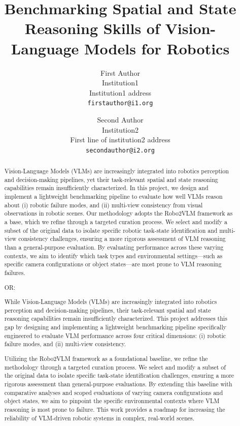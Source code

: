 \documentclass[10pt,twocolumn,letterpaper]{article}
\title{Benchmarking Spatial and State Reasoning Skills of Vision-Language Models for Robotics}
\author{First Author\\
Institution1\\
Institution1 address\\
{\tt\small firstauthor@i1.org}
\and
Second Author\\
Institution2\\
First line of institution2 address\\
{\tt\small secondauthor@i2.org}
}
\begin{document}
\maketitle
\begin{abstract}
Vision-Language Models (VLMs) are increasingly integrated into robotics perception and decision-making pipelines, yet their task-relevant spatial and state reasoning capabilities remain insufficiently characterized.
In this project, we design and implement a lightweight benchmarking pipeline to evaluate how well VLMs reason about (i) robotic failure modes, and (ii) multi-view consistency from visual observations in robotic scenes.
Our methodology adopts the Robo2VLM framework as a base, which we refine through a targeted curation process. We select and modify a subset of the original data to isolate specific robotic task-state identification and multi-view consistency challenges, ensuring a more rigorous assessment of VLM reasoning than a general-purpose evaluation.
By evaluating performance across these varying contexts, we aim to identify which task types and environmental settings—such as specific camera configurations or object states—are most prone to VLM reasoning failures.

OR:

While Vision-Language Models (VLMs) are increasingly integrated into robotics perception and decision-making pipelines, their task-relevant spatial and state reasoning capabilities remain insufficiently characterized. This project addresses this gap by designing and implementing a lightweight benchmarking pipeline specifically engineered to evaluate VLM performance across four critical dimensions: (i) robotic failure modes, and (ii) multi-view consistency.

Utilizing the Robo2VLM framework as a foundational baseline, we refine the methodology through a targeted curation process. We select and modify a subset of the original data to isolate specific task-state identification challenges, ensuring a more rigorous assessment than general-purpose evaluations. By extending this baseline with comparative analyses and scoped evaluations of varying camera configurations and object states, we aim to pinpoint the specific environmental contexts where VLM reasoning is most prone to failure. This work provides a roadmap for increasing the reliability of VLM-driven robotic systems in complex, real-world scenes.

\end{abstract}
\end{document}
